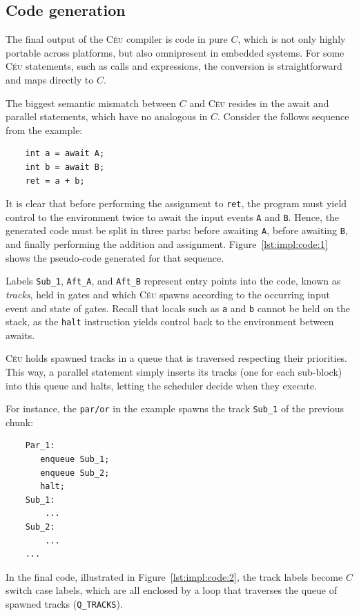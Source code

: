 \documentclass{sigplan-proc}
\newcommand{\2}{\;\;}
\newcommand{\5}{\;\;\;\;\;}
\newcommand{\CEU}{\textsc{C\'{e}u}}
\newcommand{\code}[1] {{\small{\texttt{#1}}}}
\begin{document}
\subsection{Code generation}
\label{sec:impl:code}

The final output of the \CEU{} compiler is code in pure $C$, which is not only 
highly portable across platforms, but also omnipresent in embedded systems.
For some \CEU{} statements, such as calls and expressions, the conversion is 
straightforward and maps directly to $C$.

The biggest semantic mismatch between $C$ and \CEU{} resides in the await and 
parallel statements, which have no analogous in $C$.
Consider the follows sequence from the example:
{\small
\begin{verbatim}
    int a = await A;
    int b = await B;
    ret = a + b;
\end{verbatim}
}
It is clear that before performing the assignment to \code{ret}, the program 
must yield control to the environment twice to await the input events \code{A} 
and \code{B}.
Hence, the generated code must be split in three parts: before awaiting 
\code{A}, before awaiting \code{B}, and finally performing the addition and 
assignment.
Figure~\ref{lst:impl:code:1} shows the pseudo-code generated for that sequence.
  
Labels \code{Sub\_1}, \code{Aft\_A}, and \code{Aft\_B} represent entry points 
into the code, known as \emph{tracks}, held in gates and which \CEU{} spawns 
according to the occurring input event and state of gates.
Recall that locals such as \code{a} and \code{b} cannot be held on the stack, 
as the \code{halt} instruction yields control back to the environment between 
awaits.  

\CEU{} holds spawned tracks in a queue that is traversed respecting their 
priorities.
This way, a parallel statement simply inserts its tracks (one for each 
sub-block) into this queue and halts, letting the scheduler decide when they 
execute.

For instance, the \code{par/or} in the example spawns the track \code{Sub\_1} 
of the previous chunk:
{\small
\begin{verbatim}
    Par_1:
       enqueue Sub_1;
       enqueue Sub_2;
       halt;
    Sub_1:
        ...
    Sub_2:
        ...
    ...
\end{verbatim}
}
In the final code, illustrated in Figure~\ref{lst:impl:code:2}, the track 
labels become $C$ switch case labels, which are all enclosed by a loop that 
traverses the queue of spawned tracks (\code{Q\_TRACKS}).
\end{document}
